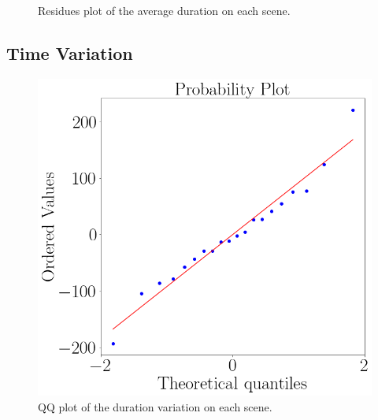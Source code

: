 \begin{figure}[!htb]
\begin{minipage}{0.45\linewidth}
            \caption{Residues plot of the average duration on each scene.}
            \label{fig:residual_duration_average}
        \end{minipage}
    \end{figure}

\FloatBarrier

\subsection{Time Variation}

    \begin{figure}[!htb]
        \begin{minipage}{0.45\linewidth}
            \centering
            \includegraphics[width = \linewidth]{Resultados/Tempo/Figuras/png/qqplot_duration_var.png}
            \caption{QQ plot of the duration variation on each scene.}
            \label{fig:qqplot_duration_average}
        \end{minipage}
        \begin{minipage}{0.1\linewidth}
            \hfill
        \end{minipage}
        \begin{minipage}{0.45\linewidth}
            \centering

\end{minipage}
\end{figure}
